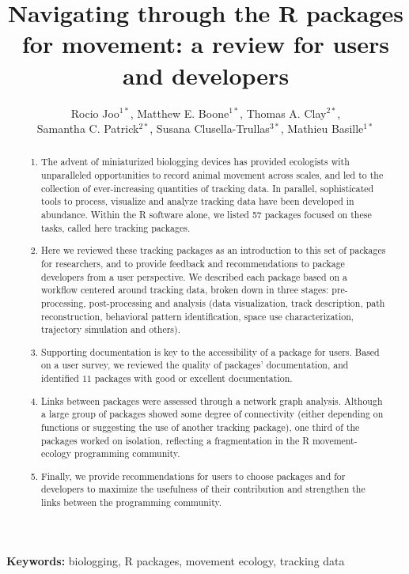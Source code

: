 \documentclass[a4paper,12pt]{article}
\title{Navigating through the R packages for movement: a review for users and developers}
\author{Rocio Joo$^{1*}$, Matthew E. Boone$^{1*}$, Thomas A. Clay$^{2*}$, \\
	Samantha C. Patrick$^{2*}$, Susana Clusella-Trullas$^{3*}$, Mathieu Basille$^{1*}$}
\begin{document}
	
	
	\maketitle
	
	
	\begin{abstract}               
		\noindent \begin{enumerate}
			\item The advent of miniaturized biologging devices has provided ecologists with unparalleled opportunities to record animal movement across scales, and led to the collection of ever-increasing quantities of tracking data. In parallel, sophisticated tools to process, visualize and analyze tracking data have been developed in abundance. Within the R software alone, we listed 57 packages focused on these tasks, called here tracking packages.
			\item Here we reviewed these tracking packages as an introduction to this set of packages for researchers, and to provide feedback and recommendations to package developers from a user perspective. We described each package based on a workflow centered around tracking data, broken down in three stages: pre-processing, post-processing and analysis (data visualization, track description, path reconstruction, behavioral pattern identification, space use characterization, trajectory simulation and others). 
			\item Supporting documentation is key  to the accessibility of a package for users. Based on a user survey, we reviewed the quality of packages' documentation, and identified $11$ packages with good or excellent documentation. 
			\item Links between packages were assessed through a network graph analysis. Although a large group of packages showed some degree of connectivity (either depending on functions or suggesting the use of another tracking package), one third of the packages worked on isolation, reflecting a fragmentation in the R movement-ecology programming community. 
			\item Finally, we provide recommendations for users to choose packages and for developers to maximize the usefulness of their contribution and strengthen the links between the programming community. 
		\end{enumerate}
	\end{abstract}
	
	\noindent \textbf{Keywords:} biologging, R packages, movement ecology, tracking data
	
\end{document}
